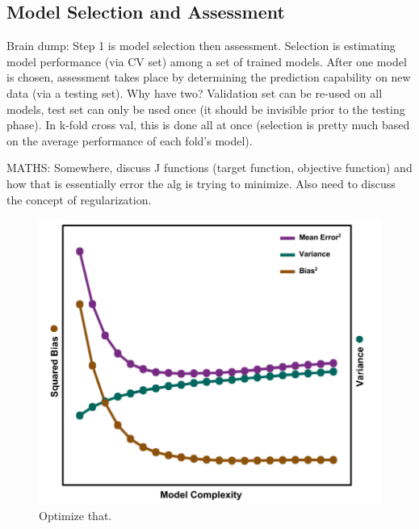 %

\subsection{Model Selection and Assessment}
\label{sec:selectass}

Brain dump:
Step 1 is model selection then assessment. Selection is estimating model
performance (via CV set) among a set of trained models. After one model is
chosen, assessment takes place by determining the prediction capability on new
data (via a testing set).  Why have two?  Validation set can be re-used on all
models, test set can only be used once (it should be invisible prior to the
testing phase).  In k-fold cross val, this is done all at once (selection is
pretty much based on the average performance of each fold's model). 

MATHS: Somewhere, discuss J functions (target function, objective function) and
how that is essentially error the alg is trying to minimize. Also need to
discuss the concept of regularization.

\begin{figure}[!htb]
  \includegraphics[width=\linewidth]{./chapters/litrev/BVtradeoff.png}
  \caption{Optimize that.}
  \label{fig:bvtradeoff}
\end{figure}

